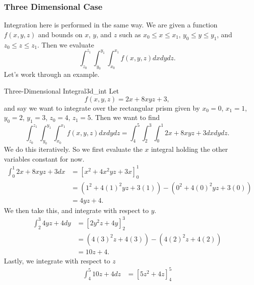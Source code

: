              	        \subsubsection{Three Dimensional Case}

             	        Integration here is performed in the same way.  We are given a function $f(x,y,z)$ and bounds on $x$, $y$, and $z$ such as $x_0\leq x \leq x_1$, $y_0\leq y\leq y_1$, and $z_0\leq z \leq z_1$. Then we evaluate
             	        \[
             	        \int_{z_0}^{z_1}\int_{y_0}^{y_1}\int_{x_0}^{x_1} f(x,y,z)dxdydz.
             	        \]
             	        Let's work through an example.

             	        \begin{ex}{Three-Dimensional Integral}{3d_int}
             	        Let
             	        \[
             	        f(x,y,z)=2x + 8xyz + 3,
             	        \]
             	        and say we want to integrate over the rectangular prism given by $x_0 = 0$, $x_1=1$, $y_0=2$, $y_1=3$, $z_0 =4$, $z_1=5$.  Then we want to find
             	        \[
             	        \int_{z_0}^{z_1}\int_{y_0}^{y_1}\int_{x_0}^{x_1} f(x,y,z)dxdydz = \int_4^5 \int_2^3 \int_0^1 2x+8xyz+3dxdydz.
             	        \]
             	        We do this iteratively.  So we first evaluate the $x$ integral holding the other variables constant for now.
             	        \begin{align*}
             	            \int_0^1 2x+8xyz+3 dx &= \left[ x^2 + 4x^2yz+3x\right]_0^1\\
             	            &= \left( 1^2 + 4(1)^2yz+3(1)\right) - \left( 0^2+4(0)^2yz+3(0)\right)\\
             	            &= 4yz+4.
             	        \end{align*}
             	        We then take this, and integrate with respect to $y$.
             	        \begin{align*}
             	            \int_2^3 4yz + 4 dy &= \left[ 2y^2z+4y\right]_2^3\\
             	            &= (4(3)^2z+4(3))-(4(2)^2z+4(2))\\
             	            &= 10z+4.
             	        \end{align*}
             	        Lastly, we integrate with respect to $z$
             	        \begin{align*}
             	            \int_4^5 10z+4 dz &= \left[ 5z^2+4z\right]_4^5\\

\end{align*}
\end{ex}
